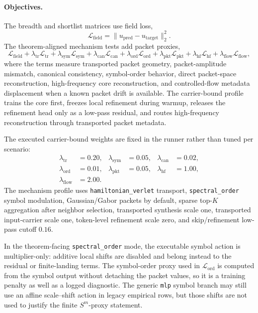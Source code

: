 \paragraph{Objectives.}
The breadth and shortlist matrices use field loss,
\[
\mathcal L_{\mathrm{field}}=\|u_{\mathrm{pred}}-u_{\mathrm{target}}\|_2^2.
\]
The theorem-aligned mechanism tests add packet proxies,
\[
\mathcal L_{\mathrm{field}}
+\lambda_{\mathrm{tr}}\mathcal L_{\mathrm{tr}}
+\lambda_{\mathrm{sym}}\mathcal L_{\mathrm{sym}}
+\lambda_{\mathrm{can}}\mathcal L_{\mathrm{can}}
+\lambda_{\mathrm{ord}}\mathcal L_{\mathrm{ord}}
+\lambda_{\mathrm{pkt}}\mathcal L_{\mathrm{pkt}}
+\lambda_{\mathrm{hf}}\mathcal L_{\mathrm{hf}}
+\lambda_{\mathrm{flow}}\mathcal L_{\mathrm{flow}},
\]
where the terms measure transported packet geometry, packet-amplitude mismatch, canonical consistency, symbol-order behavior, direct packet-space reconstruction, high-frequency core reconstruction, and controlled-flow metadata displacement when a known packet drift is available.  The carrier-bound profile trains the core first, freezes local refinement during warmup, releases the refinement head only as a low-pass residual, and routes high-frequency reconstruction through transported packet metadata.

The executed carrier-bound weights are fixed in the runner rather than tuned per scenario:
\[
\begin{aligned}
\lambda_{\mathrm{tr}}&=0.20,&
\lambda_{\mathrm{sym}}&=0.05,&
\lambda_{\mathrm{can}}&=0.02,\\
\lambda_{\mathrm{ord}}&=0.01,&
\lambda_{\mathrm{pkt}}&=0.05,&
\lambda_{\mathrm{hf}}&=1.00,\\
\lambda_{\mathrm{flow}}&=2.00.&
\end{aligned}
\]
The mechanism profile uses \texttt{hamiltonian\_verlet} transport, \texttt{spectral\_order} symbol modulation, Gaussian/Gabor packets by default, sparse top-$K$ aggregation after neighbor selection, transported synthesis scale one, transported input-carrier scale one, token-level refinement scale zero, and skip/refinement low-pass cutoff $0.16$.

In the theorem-facing \texttt{spectral\_order} mode, the executable symbol action is multiplier-only: additive local shifts are disabled and belong instead to the residual or finite-landing terms.  The symbol-order proxy used in $\mathcal L_{\mathrm{ord}}$ is computed from the symbol output without detaching the packet values, so it is a training penalty as well as a logged diagnostic.  The generic \texttt{mlp} symbol branch may still use an affine scale--shift action in legacy empirical rows, but those shifts are not used to justify the finite \(S^m\)-proxy statement.


